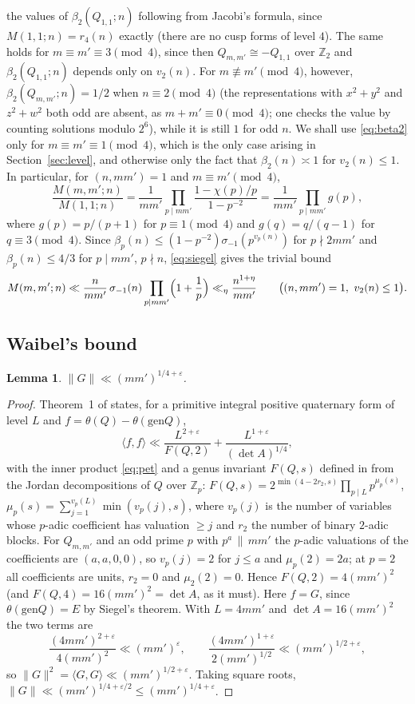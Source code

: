 \documentclass[11pt]{amsart}
\newtheorem{lemma}[theorem]{Lemma}
\theoremstyle{remark}
\newcommand{\Z}{\mathbb{Z}}
\newcommand{\e}{\varepsilon}
\newcommand{\gen}{\mathrm{gen}}
\begin{document}
the values of $\beta_2(Q_{1,1};n)$ following from Jacobi's formula, since $M(1,1;n)=r_4(n)$ exactly (there are no cusp forms of level $4$). The same holds for $m\equiv m'\equiv3\pmod 4$, since then $Q_{m,m'}\cong-Q_{1,1}$ over $\Z_2$ and $\beta_2(Q_{1,1};n)$ depends only on $v_2(n)$. For $m\not\equiv m'\pmod4$, however, $\beta_2(Q_{m,m'};n)=1/2$ when $n\equiv2\pmod4$ (the representations with $x^2+y^2$ and $z^2+w^2$ both odd are absent, as $m+m'\equiv0\pmod 4$; one checks the value by counting solutions modulo $2^6$), while it is still $1$ for odd $n$. We shall use \eqref{eq:beta2} only for $m\equiv m'\equiv1\pmod 4$, which is the only case arising in Section~\ref{sec:level}, and otherwise only the fact that $\beta_2(n)\asymp1$ for $v_2(n)\le1$. In particular, for $(n,mm')=1$ and $m\equiv m'\pmod4$,
\begin{equation}\label{eq:Mratio}
\frac{M(m,m';n)}{M(1,1;n)}=\frac1{mm'}\prod_{p\mid mm'}\frac{1-\chi(p)/p}{1-p^{-2}}=\frac1{mm'}\prod_{p\mid mm'}g(p),
\end{equation}
where $g(p)=p/(p+1)$ for $p\equiv1\pmod4$ and $g(q)=q/(q-1)$ for $q\equiv 3\pmod 4$. Since $\beta_p(n)\le(1-p^{-2})\sigma_{-1}(p^{v_p(n)})$ for $p\nmid 2mm'$ and $\beta_p(n)\le 4/3$ for $p\mid mm'$, $p\nmid n$, \eqref{eq:siegel} gives the trivial bound
\begin{equation}\label{eq:Mtrivial}
M(m,m';n)\ll\frac{n}{mm'}\,\sigma_{-1}(n)\prod_{p\mid mm'}\Bigl(1+\frac1p\Bigr)\ll_\eta\frac{n^{1+\eta}}{mm'}\qquad\bigl((n,mm')=1,\ v_2(n)\le1\bigr).
\end{equation}

\subsection{Waibel's bound}
\begin{lemma}\label{lem:waibel}
$\|G\|\ll(mm')^{1/4+\e}$.
\end{lemma}
\begin{proof}
Theorem~1 of \cite{Waibel} states, for a primitive integral positive quaternary form of level $L$ and $f=\theta(Q)-\theta(\gen Q)$,
\[
\langle f,f\rangle\ll\frac{L^{2+\e}}{F(Q,2)}+\frac{L^{1+\e}}{(\det A)^{1/4}},
\]
with the inner product \eqref{eq:pet} and a genus invariant $F(Q,s)$ defined in \cite[(6)]{Waibel} from the Jordan decompositions of $Q$ over $\Z_p$: $F(Q,s)=2^{\min(4-2r_2,s)}\prod_{p\mid L}p^{\mu_p(s)}$, $\mu_p(s)=\sum_{j=1}^{v_p(L)}\min(v_p(j),s)$, where $v_p(j)$ is the number of variables whose $p$-adic coefficient has valuation $\ge j$ and $r_2$ the number of binary $2$-adic blocks. For $Q_{m,m'}$ and an odd prime $p$ with $p^a\,\|\,mm'$ the $p$-adic valuations of the coefficients are $(a,a,0,0)$, so $v_p(j)=2$ for $j\le a$ and $\mu_p(2)=2a$; at $p=2$ all coefficients are units, $r_2=0$ and $\mu_2(2)=0$. Hence $F(Q,2)=4(mm')^2$ (and $F(Q,4)=16(mm')^2=\det A$, as it must). Here $f=G$, since $\theta(\gen Q)=E$ by Siegel's theorem. With $L=4mm'$ and $\det A=16(mm')^2$ the two terms are
\[
\frac{(4mm')^{2+\e}}{4(mm')^2}\ll(mm')^{\e},\qquad
\frac{(4mm')^{1+\e}}{2(mm')^{1/2}}\ll(mm')^{1/2+\e},
\]
so $\|G\|^2=\langle G,G\rangle\ll(mm')^{1/2+\e}$. Taking square roots, $\|G\|\ll(mm')^{1/4+\e/2}\le(mm')^{1/4+\e}$.
\end{proof}
\end{document}
